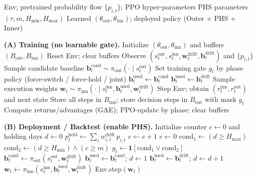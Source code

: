 \documentclass[letterpaper]{article} %
\newcommand{\algsmall}{\footnotesize}
\newcommand{\one}{\mathbf{1}}
\begin{document}
\begin{algorithm}[t]
\caption{SentinelAlpha (Train Outer/Inner; Deploy with Rule-based PHS)}
\label{alg:sentinelalpha}
\algsmall
\begin{algorithmic}[1]
\REQUIRE Env; pretrained probability flow $\{p_{i,t}\}$; PPO hyper-parameters
\REQUIRE PHS parameters $(\tau,m,H_{\min},H_{\max})$
\ENSURE Learned $(\theta_{\mathrm{out}},\theta_{\mathrm{inn}})$; deployed policy (Outer + PHS + Inner)

\STATE \textbf{(A) Training (no learnable gate).}
\STATE Initialize $(\theta_{\mathrm{out}},\theta_{\mathrm{inn}})$ and buffers $(B_{\mathrm{out}},B_{\mathrm{inn}})$
    \STATE Reset Env; clear buffers
      \STATE Observe $(s_t^{\mathrm{out}}, s_t^{\mathrm{inn}}, \mathbf{w}_t^{\mathrm{drift}}, \mathbf{b}_t^{\mathrm{drift}})$ and $\{p_{i,t}\}$
      \STATE Sample candidate baseline $\mathbf{b}_t^{\mathrm{cand}} \sim \pi_{\mathrm{out}}(\cdot \mid s_t^{\mathrm{out}})$
      \STATE Set training gate $g_t$ by phase policy (force-switch / force-hold / joint)
        \STATE $\mathbf{b}_t^{\mathrm{used}} \gets \mathbf{b}_t^{\mathrm{cand}}$
      \ELSE
        \STATE $\mathbf{b}_t^{\mathrm{used}} \gets \mathbf{b}_t^{\mathrm{drift}}$
      \ENDIF
      \STATE Sample execution weights $\mathbf{w}_t \sim \pi_{\mathrm{inn}}(\cdot \mid s_t^{\mathrm{inn}},\mathbf{b}_t^{\mathrm{used}},\mathbf{w}_t^{\mathrm{drift}})$
      \STATE Step Env; obtain $(r_t^{\mathrm{inn}}, r_t^{\mathrm{out}})$ and next state
      \STATE Store all steps in $B_{\mathrm{inn}}$; store decision steps in $B_{\mathrm{out}}$ with mask $g_t$
    \ENDWHILE
    \STATE Compute returns/advantages (GAE); PPO-update by phase; clear buffers
  \ENDFOR
\ENDFOR

\STATE \textbf{(B) Deployment / Backtest (enable PHS).}
\STATE Initialize counter $c\gets 0$ and holding days $d\gets 0$
  \STATE $p_t^{\mathrm{held}} \gets \sum_i w^{\mathrm{drift}}_{i,t}\,p_{i,t}$
    \STATE $c \gets c+1$
  \ELSE
    \STATE $c \gets 0$
  \ENDIF
  \STATE $\text{cond}_1 \gets (d \ge H_{\max})$
  \STATE $\text{cond}_2 \gets (d \ge H_{\min}) \land (c \ge m)$
  \STATE $g_t \gets \one[\text{cond}_1 \lor \text{cond}_2]$
  \STATE $\mathbf{b}_t^{\mathrm{cand}} \gets \pi_{\mathrm{out}}(s_t^{\mathrm{out}},\mathbf{w}_t^{\mathrm{drift}})$
    \STATE $\mathbf{b}_t^{\mathrm{used}} \gets \mathbf{b}_t^{\mathrm{cand}}$; $d \gets 1$
  \ELSE
    \STATE $\mathbf{b}_t^{\mathrm{used}} \gets \mathbf{b}_t^{\mathrm{drift}}$; $d \gets d+1$
  \ENDIF
  \STATE $\mathbf{w}_t \gets \pi_{\mathrm{inn}}(s_t^{\mathrm{inn}},\mathbf{b}_t^{\mathrm{used}},\mathbf{w}_t^{\mathrm{drift}})$
  \STATE Env.step$(\mathbf{w}_t)$
\ENDFOR
\end{algorithmic}
\end{algorithm}
\end{document}
